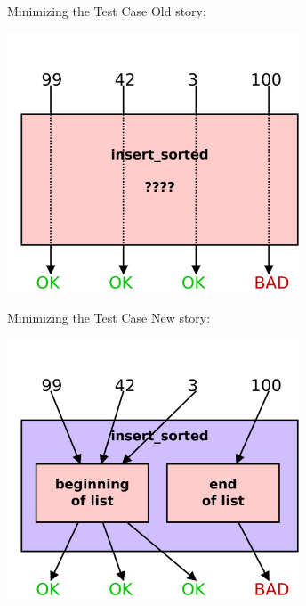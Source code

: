 \documentclass[xcolor=dvipsnames]{beamer}
\begin{document}
\begin{frame}{Minimizing the Test Case}
	Old story:

	\begin{center}
	\includegraphics[width=0.65\textwidth]{space0.png}
	\end{center}
\end{frame}
\begin{frame}{Minimizing the Test Case}
	New story:

	\begin{center}
	\includegraphics[width=0.65\textwidth]{space1.png}
	\end{center}
\end{frame}
\end{document}

